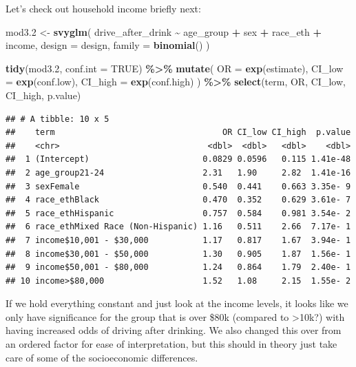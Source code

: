 \documentclass[
]{article}
\newenvironment{Shaded}{\begin{snugshade}}{\end{snugshade}}
\newcommand{\AttributeTok}[1]{\textcolor[rgb]{0.13,0.29,0.53}{#1}}
\newcommand{\ConstantTok}[1]{\textcolor[rgb]{0.56,0.35,0.01}{#1}}
\newcommand{\FloatTok}[1]{\textcolor[rgb]{0.00,0.00,0.81}{#1}}
\newcommand{\FunctionTok}[1]{\textcolor[rgb]{0.13,0.29,0.53}{\textbf{#1}}}
\newcommand{\NormalTok}[1]{#1}
\newcommand{\OtherTok}[1]{\textcolor[rgb]{0.56,0.35,0.01}{#1}}
\newcommand{\SpecialCharTok}[1]{\textcolor[rgb]{0.81,0.36,0.00}{\textbf{#1}}}
\begin{document}
Let's check out household income briefly next:

\begin{Shaded}
\begin{Highlighting}[]
\NormalTok{mod3}\FloatTok{.2} \OtherTok{\textless{}{-}} \FunctionTok{svyglm}\NormalTok{(}
\NormalTok{  drive\_after\_drink }\SpecialCharTok{\textasciitilde{}}\NormalTok{ age\_group }\SpecialCharTok{+}\NormalTok{ sex }\SpecialCharTok{+}\NormalTok{ race\_eth }\SpecialCharTok{+}\NormalTok{ income,}
  \AttributeTok{design =}\NormalTok{ design,}
  \AttributeTok{family =} \FunctionTok{binomial}\NormalTok{()}
\NormalTok{) }

\FunctionTok{tidy}\NormalTok{(mod3}\FloatTok{.2}\NormalTok{, }\AttributeTok{conf.int =} \ConstantTok{TRUE}\NormalTok{) }\SpecialCharTok{\%\textgreater{}\%}
  \FunctionTok{mutate}\NormalTok{(}
    \AttributeTok{OR =} \FunctionTok{exp}\NormalTok{(estimate),}
    \AttributeTok{CI\_low =} \FunctionTok{exp}\NormalTok{(conf.low),}
    \AttributeTok{CI\_high =} \FunctionTok{exp}\NormalTok{(conf.high)}
\NormalTok{  ) }\SpecialCharTok{\%\textgreater{}\%}
  \FunctionTok{select}\NormalTok{(term, OR, CI\_low, CI\_high, p.value)}
\end{Highlighting}
\end{Shaded}

\begin{verbatim}
## # A tibble: 10 x 5
##    term                                  OR CI_low CI_high  p.value
##    <chr>                              <dbl>  <dbl>   <dbl>    <dbl>
##  1 (Intercept)                       0.0829 0.0596   0.115 1.41e-48
##  2 age_group21-24                    2.31   1.90     2.82  1.41e-16
##  3 sexFemale                         0.540  0.441    0.663 3.35e- 9
##  4 race_ethBlack                     0.470  0.352    0.629 3.61e- 7
##  5 race_ethHispanic                  0.757  0.584    0.981 3.54e- 2
##  6 race_ethMixed Race (Non-Hispanic) 1.16   0.511    2.66  7.17e- 1
##  7 income$10,001 - $30,000           1.17   0.817    1.67  3.94e- 1
##  8 income$30,001 - $50,000           1.30   0.905    1.87  1.56e- 1
##  9 income$50,001 - $80,000           1.24   0.864    1.79  2.40e- 1
## 10 income>$80,000                    1.52   1.08     2.15  1.55e- 2
\end{verbatim}

If we hold everything constant and just look at the income levels, it
looks like we only have significance for the group that is over \$80k
(compared to \textgreater10k?) with having increased odds of driving
after drinking. We also changed this over from an ordered factor for
ease of interpretation, but this should in theory just take care of some
of the socioeconomic differences.
\end{document}
